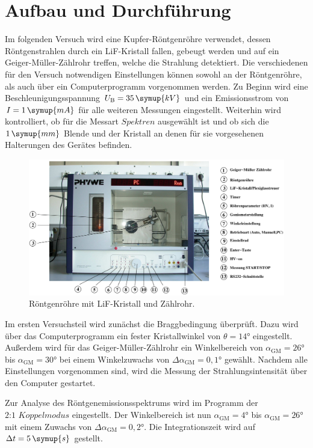 \section{Aufbau und Durchführung}

Im folgenden Versuch wird eine Kupfer-Röntgenröhre verwendet, dessen Röntgenstrahlen durch ein LiF-Kristall fallen, gebeugt werden und auf ein Geiger-Müller-Zählrohr treffen, welche die Strahlung detektiert.
Die verschiedenen für den Versuch notwendigen Einstellungen können sowohl an der Röntgenröhre, als auch über ein Computerprogramm vorgenommen werden. Zu Beginn wird eine Beschleunigungsspannung $U_{\text{B}} = 35\,\symup{kV}$ 
und ein Emissionsstrom von $I = 1\,\symup{mA}$ für alle weiteren Messungen eingestellt. Weiterhin wird kontrolliert, ob für die Messart $Spektren$ ausgewählt ist und ob sich die $1\,\symup{mm}$ Blende und der Kristall an 
denen für sie vorgesehenen Halterungen des Gerätes befinden.

\begin{figure}[h!]
	\centering
	\includegraphics[width=0.9\linewidth]{aufbau.png}
	\caption{Röntgenröhre mit LiF-Kristall und Zählrohr. \cite[4]{anleitung602}}
	\label{fig:aufbau}
\end{figure}

Im ersten Versuchsteil wird zunächst die Braggbedingung überprüft. Dazu wird über das Computerprogramm ein fester Kristallwinkel von $\theta = 14°$ eingestellt. Außerdem wird für das Geiger-Müller-Zählrohr ein Winkelbereich von 
$\alpha_{\text{GM}} = 26°$ bis $\alpha_{\text{GM}} = 30°$ bei einem Winkelzuwachs von $\Delta \alpha_{\text{GM}} = 0{,}1°$ gewählt. Nachdem alle Einstellungen vorgenommen sind, wird die Messung der Strahlungsintensität über 
den Computer gestartet.

Zur Analyse des Röntgenemissionsspektrums wird im Programm der $2\text{:}1 \,\,Koppelmodus$ eingestellt. Der Winkelbereich ist nun $\alpha_{\text{GM}} = 4°$ bis $\alpha_{\text{GM}} = 26°$ mit einem Zuwachs von $\Delta \alpha_{\text{GM}} = 0{,}2°$. Die Integrationszeit
wird auf  $\Delta t = 5\,\symup{s}$ gestellt.

